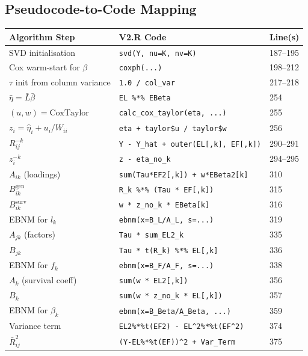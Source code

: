 \documentclass[11pt]{article}
\newcommand{\coderef}[1]{{\color{blue!70!black}\texttt{#1}}}
\begin{document}
\subsection{Pseudocode-to-Code Mapping}

\begin{center}
\small
\begin{longtable}{p{5cm}p{5cm}p{3cm}}
\toprule
\textbf{Algorithm Step} & \textbf{V2.R Code} & \textbf{Line(s)} \\
\midrule
\endhead
SVD initialisation & \coderef{svd(Y, nu=K, nv=K)} & 187--195 \\
Cox warm-start for $\beta$ & \coderef{coxph(...)} & 198--212 \\
$\tau$ init from column variance & \coderef{1.0 / col\_var} & 217--218 \\
\midrule
$\hat{\eta} = \bar{L}\bar{\beta}$ & \coderef{EL \%*\% EBeta} & 254 \\
$(u, w) = \text{CoxTaylor}$ & \coderef{calc\_cox\_taylor(eta, ...)} & 255 \\
$z_i = \hat{\eta}_i + u_i/W_{ii}$ & \coderef{eta + taylor\$u / taylor\$w} & 256 \\
\midrule
$R^{-k}_{ij}$ & \coderef{Y - Y\_hat + outer(EL[,k], EF[,k])} & 290--291 \\
$z^{-k}_i$ & \coderef{z - eta\_no\_k} & 294--295 \\
\midrule
$A_{ik}$ (loadings) & \coderef{sum(Tau*EF2[,k]) + w*EBeta2[k]} & 310 \\
$B^{\text{gen}}_{ik}$ & \coderef{R\_k \%*\% (Tau * EF[,k])} & 315 \\
$B^{\text{surv}}_{ik}$ & \coderef{w * z\_no\_k * EBeta[k]} & 316 \\
EBNM for $l_k$ & \coderef{ebnm(x=B\_L/A\_L, s=...)} & 319 \\
\midrule
$A_{jk}$ (factors) & \coderef{Tau * sum\_EL2\_k} & 335 \\
$B_{jk}$ & \coderef{Tau * t(R\_k) \%*\% EL[,k]} & 336 \\
EBNM for $f_k$ & \coderef{ebnm(x=B\_F/A\_F, s=...)} & 338 \\
\midrule
$A_k$ (survival coeff) & \coderef{sum(w * EL2[,k])} & 356 \\
$B_k$ & \coderef{sum(w * z\_no\_k * EL[,k])} & 357 \\
EBNM for $\beta_k$ & \coderef{ebnm(x=B\_Beta/A\_Beta, ...)} & 359 \\
\midrule
Variance term & \coderef{EL2\%*\%t(EF2) - EL\^{}2\%*\%t(EF\^{}2)} & 374 \\
$\bar{R}^2_{ij}$ & \coderef{(Y-EL\%*\%t(EF))\^{}2 + Var\_Term} & 375 \\

\end{longtable}
\end{center}
\end{document}
